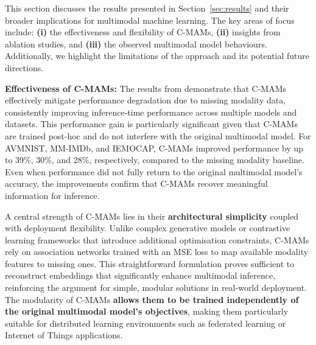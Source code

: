 
This section discusses the results presented in Section~\ref{sec:results} and their broader implications for multimodal machine learning. The key areas of focus include: \textbf{(i)} the effectiveness and flexibility of C-MAMs, \textbf{(ii)} insights from ablation studies, and \textbf{(iii)} the observed multimodal model behaviours. Additionally, we highlight the limitations of the approach and its potential future directions.

\textbf{Effectiveness of C-MAMs:} The results from  demonstrate that C-MAMs effectively mitigate performance degradation due to missing modality data, consistently improving inference-time performance across multiple models and datasets. This performance gain is particularly significant given that C-MAMs are trained post-hoc and do not interfere with the original multimodal model. For AVMNIST, MM-IMDb, and IEMOCAP, C-MAMs improved performance by up to 39\%, 30\%, and 28\%, respectively, compared to the missing modality baseline. Even when performance did not fully return to the original multimodal model's accuracy, the improvements confirm that C-MAMs recover meaningful information for inference.

A central strength of C-MAMs lies in their \textbf{architectural simplicity} coupled with deployment flexibility. Unlike complex generative models or contrastive learning frameworks that introduce additional optimisation constraints, C-MAMs rely on association networks trained with an MSE loss to map available modality features to missing ones. This straightforward formulation proves sufficient to reconstruct embeddings that significantly enhance multimodal inference, reinforcing the argument for simple, modular solutions in real-world deployment. The modularity of C-MAMs \textbf{allows them to be trained independently of the original multimodal model's objectives}, making them particularly suitable for distributed learning environments such as federated learning or Internet of Things applications.

